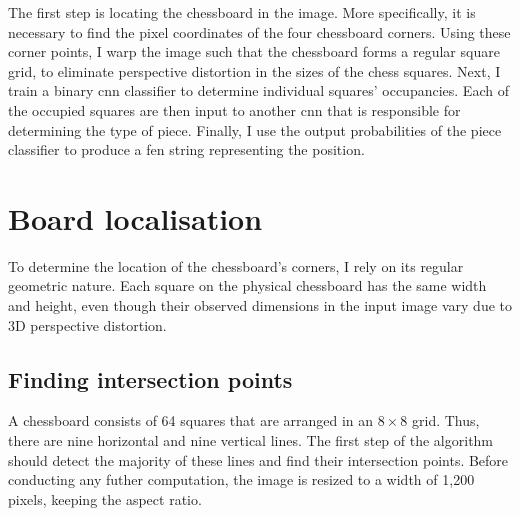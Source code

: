 \documentclass[../report.tex]{subfiles}
\begin{document}
The first step is locating the chessboard in the image.
More specifically, it is necessary to find the pixel coordinates of the four chessboard corners. 
Using these corner points, I warp the image such that the chessboard forms a regular square grid, to eliminate perspective distortion in the sizes of the chess squares.
Next, I train a binary \gls{cnn} classifier to determine individual squares' occupancies.
Each of the occupied squares are then input to another \gls{cnn} that is responsible for determining the type of piece. 
Finally, I use the output probabilities of the piece classifier to produce a \gls{fen} string representing the position. 


\section{Board localisation}
\label{sec:board_localisation}
To determine the location of the chessboard's corners, I rely on its regular geometric nature. 
Each square on the physical chessboard has the same width and height, even though their observed dimensions in the input image vary due to 3D perspective distortion.

\subsection{Finding intersection points}
\label{sec:find_intersection_points}
A chessboard consists of 64 squares that are arranged in an $8\times 8$ grid.
Thus, there are nine horizontal and nine vertical lines.
The first step of the algorithm should detect the majority of these lines and find their intersection points.
Before conducting any futher computation, the image is resized to a width of 1,200 pixels, keeping the aspect ratio.
\end{document}
